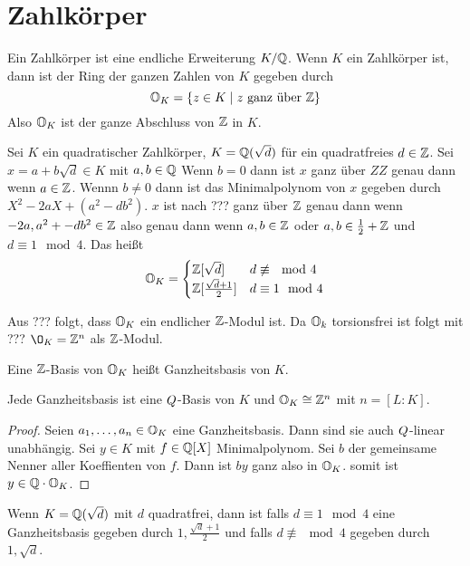 \section{Zahlkörper}
\begin{Def}
    Ein Zahlkörper ist eine endliche Erweiterung \(K/\mathbb{Q}\). Wenn \(K\) ein Zahlkörper ist, dann
    ist der Ring der ganzen Zahlen von \(K\) gegeben durch
    \[\mathbb{O}_K=\{z\in K\mid z \text{ ganz über }\mathbb{Z}\}\]
    Also \(\mathbb{O}_K\) ist der ganze Abschluss von \(\mathbb{Z}\) in \(K\).
\end{Def}
\begin{Bsp}
    Sei \(K\) ein quadratischer Zahlkörper, \(K=\mathbb{Q}(\sqrt{d})\) für ein quadratfreies \(d\in \mathbb{Z}\).
    Sei \(x=a+b\sqrt{d}\in K\) mit \(a,b\in \mathbb{Q}\)
    Wenn \(b=0\) dann ist \(x\) ganz über \(ZZ\) genau dann wenn \(a\in \mathbb{Z}\).
    Wennn \(b\neq 0\) dann ist das Minimalpolynom von \(x\) gegeben durch 
    \(X^2-2aX+(a^2-db^2)\).
    \(x\) ist nach ??? ganz über \(\mathbb{Z}\) genau dann wenn \(-2a, a^2+-db^2\in \mathbb{Z}\) also genau dann
    wenn \(a,b\in \mathbb{Z}\) oder \(a,b\in \frac 1 2+\mathbb{Z}\) und \(d\equiv 1 \mod 4\).
    Das heißt \[\mathbb{O}_K=\begin{cases}
        \mathbb{Z}[\sqrt{d}] & d\not\equiv \mod 4\\
        \mathbb{Z}[\frac{\sqrt{d}+1}{2}] & d\equiv 1 \mod 4
    \end{cases}\]
\end{Bsp}
\begin{Bem}
    Aus ??? folgt, dass \(\mathbb{O}_K\) ein endlicher \(\mathbb{Z}\)-Modul ist.
    Da \(\mathbb{O}_k\) torsionsfrei ist folgt mit ???
    \(\O_K=\ZZ^n\) als \(\mathbb{Z}\)-Modul.
\end{Bem}
\begin{Def} Eine \(\mathbb{Z}\)-Basis von \(\mathbb{O}_K\) heißt Ganzheitsbasis von \(K\).
\end{Def}
\begin{Lemma}
    Jede Ganzheitsbasis ist eine \(\\Q\)-Basis von \(K\) und \(\mathbb{O}_K\cong \mathbb{Z}^n\) mit 
    \(n=[L:K]\).
\end{Lemma}
\begin{proof}
    Seien \(a_1,\dots,a_n\in\mathbb{O}_K\) eine Ganzheitsbasis.
    Dann sind sie auch \(\\Q\)-linear unabhängig.
    Sei \(y\in K\) mit \(f\in \mathbb{Q}[X]\) Minimalpolynom.
    Sei \(b\) der gemeinsame Nenner aller Koeffienten von \(f\).
    Dann ist \(by\) ganz also in \(\mathbb{O}_K\).
    somit ist \(y\in \mathbb{Q}\cdot \mathbb{O}_K\).
\end{proof}
\begin{Bsp}
    Wenn \(K=\mathbb{Q}(\sqrt{d})\) mit \(d\) quadratfrei, dann ist
    falls \(d\equiv 1 \mod 4\) eine Ganzheitsbasis gegeben durch 
    \(1,\frac{\sqrt{d}+1}{2}\) und falls \(d\not\equiv \mod 4\) gegeben durch 
    \(1,\sqrt{d}\).
\end{Bsp}
